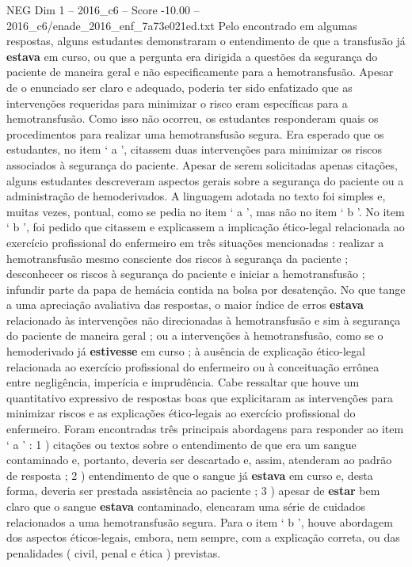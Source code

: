 \begin{textsample}{NEG Dim 1 – 2016\_c6 – Score -10.00 – 2016\_c6/enade\_2016\_enf\_7a73e021ed.txt}
Pelo encontrado em algumas respostas, alguns estudantes demonstraram o entendimento de que a transfusão já \textbf{estava} em curso, ou que a pergunta era dirigida a questões da segurança do paciente de maneira geral e não especificamente para a hemotransfusão.
Apesar de o enunciado ser claro e adequado, poderia ter sido enfatizado que as intervenções requeridas para minimizar o risco eram específicas para a hemotransfusão.
Como isso não ocorreu, os estudantes responderam quais os procedimentos para realizar uma hemotransfusão segura.
Era esperado que os estudantes, no item ‘ a ’, citassem duas intervenções para minimizar os riscos associados à segurança do paciente.
Apesar de serem solicitadas apenas citações, alguns estudantes descreveram aspectos gerais sobre a segurança do paciente ou a administração de hemoderivados.
A linguagem adotada no texto foi simples e, muitas vezes, pontual, como se pedia no item ‘ a ’, mas não no item ‘ b ’.
No item ‘ b ’, foi pedido que citassem e explicassem a implicação ético-legal relacionada ao exercício profissional do enfermeiro em três situações mencionadas : realizar a hemotransfusão mesmo consciente dos riscos à segurança da paciente ; desconhecer os riscos à segurança do paciente e iniciar a hemotransfusão ; infundir parte da papa de hemácia contida na bolsa por desatenção.
No que tange a uma apreciação avaliativa das respostas, o maior índice de erros \textbf{estava} relacionado às intervenções não direcionadas à hemotransfusão e sim à segurança do paciente de maneira geral ; ou a intervenções à hemotransfusão, como se o hemoderivado já \textbf{estivesse} em curso ; à ausência de explicação ético-legal relacionada ao exercício profissional do enfermeiro ou à conceituação errônea entre negligência, imperícia e imprudência.
Cabe ressaltar que houve um quantitativo expressivo de respostas boas que explicitaram as intervenções para minimizar riscos e as explicações ético-legais ao exercício profissional do enfermeiro.
Foram encontradas três principais abordagens para responder ao item ‘ a ’ : 1 ) citações ou textos sobre o entendimento de que era um sangue contaminado e, portanto, deveria ser descartado e, assim, atenderam ao padrão de resposta ; 2 ) entendimento de que o sangue já \textbf{estava} em curso e, desta forma, deveria ser prestada assistência ao paciente ; 3 ) apesar de \textbf{estar} bem claro que o sangue \textbf{estava} contaminado, elencaram uma série de cuidados relacionados a uma hemotransfusão segura.
Para o item ‘ b ’, houve abordagem dos aspectos éticos-legais, embora, nem sempre, com a explicação correta, ou das penalidades ( civil, penal e ética ) previstas.

\end{textsample}
